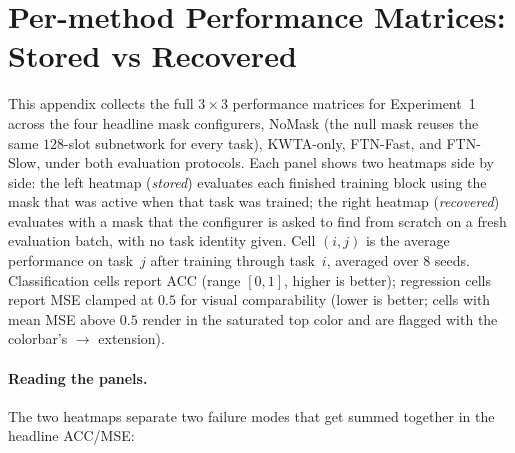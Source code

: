 \documentclass{article}
\begin{document}



\appendix

\section{Per-method Performance Matrices: Stored vs Recovered}
\label{app:perf_matrices}

This appendix collects the full $3{\times}3$ performance matrices for Experiment~1 across the four headline mask configurers, NoMask (the null mask reuses the same $128$-slot subnetwork for every task), KWTA-only, FTN-Fast, and FTN-Slow, under both evaluation protocols. Each panel shows two heatmaps side by side: the left heatmap (\emph{stored}) evaluates each finished training block using the mask that was active when that task was trained; the right heatmap (\emph{recovered}) evaluates with a mask that the configurer is asked to find from scratch on a fresh evaluation batch, with no task identity given. Cell $(i,j)$ is the average performance on task~$j$ after training through task~$i$, averaged over $8$ seeds. Classification cells report ACC (range $[0,1]$, higher is better); regression cells report MSE clamped at $0.5$ for visual comparability (lower is better; cells with mean MSE above $0.5$ render in the saturated top color and are flagged with the colorbar's $\rightarrow$ extension).

\paragraph{Reading the panels.}
The two heatmaps separate two failure modes that get summed together in the headline ACC/MSE:
\end{document}
